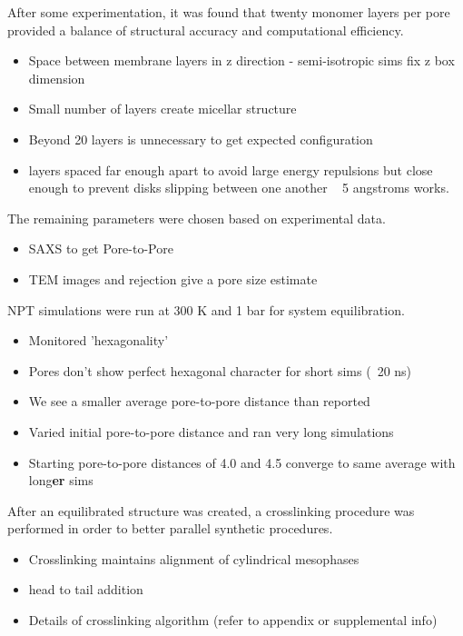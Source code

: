 \documentclass{article}
\begin{document}
	After some experimentation, it was found that twenty monomer layers per pore provided a balance of structural accuracy and computational efficiency. 
	\begin{itemize}
		\item Space between membrane layers in z direction - semi-isotropic sims fix z box dimension
		\item Small number of layers create micellar structure
		\item Beyond 20 layers is unnecessary to get expected configuration
		\item layers spaced far enough apart to avoid large energy repulsions but close enough to prevent disks slipping between one another ~ 5 angstroms works.
	\end{itemize}
	
	\noindent The remaining parameters were chosen based on experimental data. 
	\begin{itemize}
		\item SAXS to get Pore-to-Pore
		\item TEM images and rejection give a pore size estimate
	\end{itemize}
	
	\noindent NPT simulations were run at 300 K and 1 bar for system equilibration.
	\begin{itemize}
		\item Monitored 'hexagonality'
		\item Pores don't show perfect hexagonal character for short sims (~20 ns) 
		\item We see a smaller average pore-to-pore distance than reported
		\item Varied initial pore-to-pore distance and ran very long simulations
		\item Starting pore-to-pore distances of 4.0 and 4.5 converge to same average with long\textbf{er} sims 
	\end{itemize}
	
	After an equilibrated structure was created, a crosslinking procedure was performed in order to better parallel synthetic procedures. 
	\begin{itemize}
		\item Crosslinking maintains alignment of cylindrical mesophases
		\item head to tail addition
		\item Details of crosslinking algorithm (refer to appendix or supplemental info)
	\end{itemize}  
	
\end{document}
